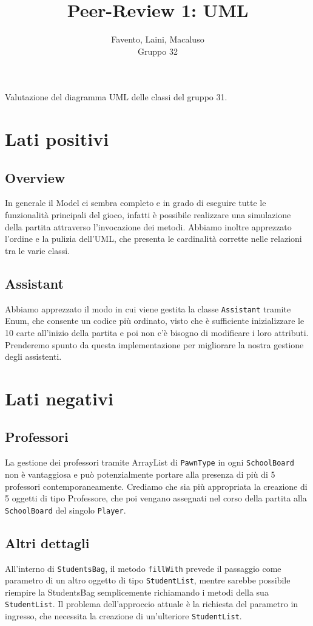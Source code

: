 \documentclass[12pt]{article}
\title{Peer-Review 1: UML}
\author{Favento, Laini, Macaluso\\Gruppo 32}
\begin{document}
\maketitle

\centerline {Valutazione del diagramma UML delle classi del gruppo 31.}

\section{Lati positivi}

\subsection{Overview}
In generale il Model ci sembra completo e in grado di eseguire tutte le funzionalità principali del gioco, infatti è possibile realizzare una simulazione della partita attraverso l'invocazione dei metodi. Abbiamo inoltre apprezzato l'ordine e la pulizia dell'UML, che presenta le cardinalità corrette nelle relazioni tra le varie classi.


\subsection{Assistant}
Abbiamo apprezzato il modo in cui viene gestita la classe \texttt{Assistant} tramite Enum, che consente un codice più ordinato, visto che è sufficiente inizializzare le 10 carte all'inizio della partita e poi non c'è bisogno di modificare i loro attributi. Prenderemo spunto da questa implementazione per migliorare la nostra gestione degli assistenti.



\section{Lati negativi}
\subsection{Professori}
La gestione dei professori tramite ArrayList di \texttt{PawnType} in ogni \texttt{SchoolBoard} non è vantaggiosa e può potenzialmente portare alla presenza di più di 5 professori contemporaneamente. Crediamo che sia più appropriata la creazione di 5 oggetti di tipo Professore, che poi vengano assegnati nel corso della partita alla \texttt{SchoolBoard} del singolo \texttt{Player}.

\subsection{Altri dettagli}
All'interno di \texttt{StudentsBag}, il metodo \texttt{fillWith} prevede il passaggio come parametro di un altro oggetto di tipo \texttt{StudentList}, mentre sarebbe possibile riempire la StudentsBag semplicemente richiamando i metodi della sua \texttt{StudentList}. Il problema dell'approccio attuale è la richiesta del parametro in ingresso, che necessita la creazione di un'ulteriore \texttt{StudentList}.
\end{document}
